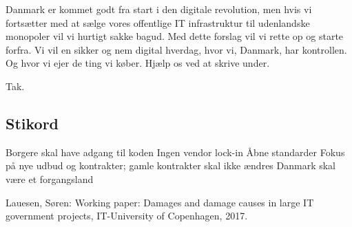 \documentclass[fleqn]{article}
\begin{document}
Danmark er kommet godt fra start i den digitale revolution, men hvis vi fortsætter
med at sælge vores offentlige IT infrastruktur til udenlandske monopoler vil vi
hurtigt sakke bagud.
Med dette forslag vil vi rette op og starte forfra. Vi vil en sikker og nem digital
hverdag, hvor vi, Danmark, har kontrollen. Og hvor vi ejer de ting vi køber.
Hjælp os ved at skrive under.

Tak.

\subsection{Stikord}
Borgere skal have adgang til koden
Ingen vendor lock-in
Åbne standarder
Fokus på nye udbud og kontrakter; gamle kontrakter skal ikke ændres
Danmark skal være et forgangsland

\begin{thebibliography}{1}

 Lauesen, Søren: Working paper: Damages and damage causes in
large IT government projects, IT-University of Copenhagen, 2017.
\end{thebibliography}
\end{document}
